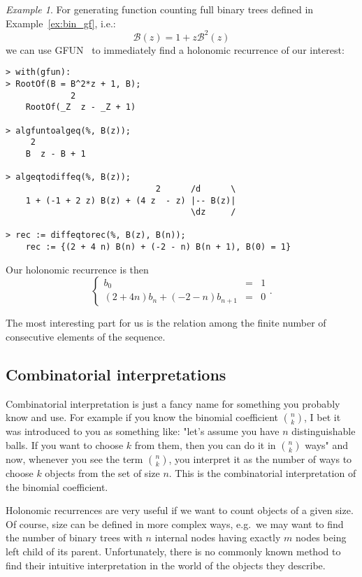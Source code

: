 \documentclass[final]{article}
\theoremstyle{definition}
\theoremstyle{definition}
\theoremstyle{remark}
\newtheorem{example}{Example}[subsection]
\newcommand{\gf}[1]{\ensuremath{\mathcal{#1}}}
\begin{document}
\begin{example}
    \label{ex:gfun-rec}
    For generating function counting full binary trees defined in Example~\ref{ex:bin_gf}, i.e.:
    \[\gf{B}(z) = 1 + z\gf{B}^2(z)\]
    we can use GFUN~\cite{gfun} to immediately find a holonomic recurrence of our interest:

    \begin{lstlisting}
> with(gfun):
> RootOf(B = B^2*z + 1, B);
             2
    RootOf(_Z  z - _Z + 1)

> algfuntoalgeq(%, B(z));
     2
    B  z - B + 1

> algeqtodiffeq(%, B(z));
                              2      /d      \
    1 + (-1 + 2 z) B(z) + (4 z  - z) |-- B(z)|
                                     \dz     /

> rec := diffeqtorec(%, B(z), B(n));
    rec := {(2 + 4 n) B(n) + (-2 - n) B(n + 1), B(0) = 1}
    \end{lstlisting}

    Our holonomic recurrence is then
    \[\left\{\begin{array}{rcl}
                b_0 &=& 1\\
                (2 + 4 n) b_n + (-2 - n) b_{n + 1} &=& 0
    \end{array}\right. .\]

    The most interesting part for us is the relation among the finite number of consecutive elements of the sequence.
\end{example}

\subsection{Combinatorial interpretations}%
\label{sub:combinatorial_interpretations}

Combinatorial interpretation is just a fancy name for something you probably know and use. For example if you know the binomial coefficient \(\binom{n}{k}\), I bet it was introduced to you as something like: "let's assume you have \(n\) distinguishable balls. If you want to choose \(k\) from them, then you can do it in \(\binom{n}{k}\) ways" and now, whenever you see the term \(\binom{n}{k}\), you interpret it as the number of ways to choose \(k\) objects from the set of size \(n\). This is the combinatorial interpretation of the binomial coefficient.

Holonomic recurrences are very useful if we want to count objects of a given size. Of course, size can be defined in more complex ways, e.g.\ we may want to find the number of binary trees with \(n\) internal nodes having exactly \(m\) nodes being left child of its parent. Unfortunately, there is no commonly known method to find their intuitive interpretation in the world of the objects they describe.
\end{document}

